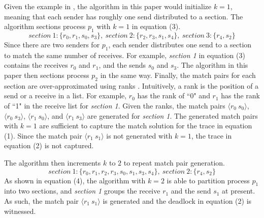 Given the example in , the algorithm in this paper would initialize $k=1$, meaning that each sender has roughly one send distributed to a section. The algorithm sections process $p_1$ with $k=1$ in equation (3).
\begin{equation} 
\mathit{section\ 1: }\{r_0,r_1,s_0,s_3\},\ \mathit{section\ 2: }\{r_2,r_3,s_1,s_4\},\ \mathit{section\ 3: }\{r_4,s_2\}
\end{equation}
Since there are two senders for $p_1$, each sender distributes one send to a section to match the same number of receives. 
For example, \textit{section 1} in equation (3) contains the receives $r_0$ and $r_1$, and the sends $s_0$ and $s_3$. 
The algorithm in this paper then sections process $p_2$ in the same way.
Finally, the match pairs for each section are over-approximated using ranks \cite{DBLP:conf/kbse/HuangMM13}. Intuitively, a rank is the position of a send or a receive in a list. For example, $r_0$ has the rank of ``0" and $r_1$ has the rank of ``1" in the receive list for \textit{section 1}. Given the ranks, the match pairs $\langle r_0\ s_0\rangle$, $\langle r_0\ s_3\rangle$, $\langle r_1\ s_0\rangle$, and $\langle r_1\ s_3\rangle$ are generated for \textit{section 1}.
The generated match pairs with $k=1$ are sufficient to capture the match solution for the trace in equation (1). 
Since the match pair $\langle r_1\ s_1\rangle$ is not generated with $k=1$, the trace in equation (2) is not captured. 

The algorithm then increments $k$ to $2$ to repeat match pair generation. 
\begin{equation}
\mathit{section\ 1: }\{r_0,r_1, r_2,r_3,s_0,s_1,s_3,s_4\},\ \mathit{section\ 2: }\{r_4,s_2\}
\end{equation}
As shown in equation (4), the algorithm with $k=2$ is able to partition process $p_1$ into two sections, and \textit{section 1}  groups the receive $r_1$ and the send $s_1$ at present. As such, the match pair $\langle r_1\ s_1\rangle$ is generated and the deadlock in equation (2) is witnessed.

